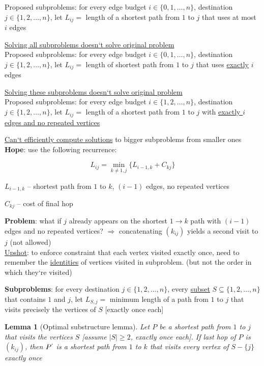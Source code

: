 \documentclass[a4paper,12pt]{article}
\theoremstyle{plain}
\newtheorem*{lemma}{Lemma}
\theoremstyle{definition}
\theoremstyle{remark}
\begin{document}
Proposed subproblems: for every edge budget $i \in \{0, 1, \dots, n\}$, destination $j \in \{1, 2, \dots, n\}$, let $L_{ij} =$ length of a shortest path from $1$ to $j$ that uses at most $i$ edges

\underline{Solving all subproblems doesn`t solve original problem}
\\

Proposed subproblems: for every edge budget $i \in \{0, 1, \dots, n\}$, destination $j \in \{1, 2, \dots, n\}$, let $L_{ij} =$ length of shortest path from $1$ to $j$ that uses \underline{exactly} $i$ edges

\underline{Solving these subproblems doesn`t solve original problem}
\\

Proposed subproblems: for every edge budget $i \in \{1, 2, \dots, n\}$, destination $j \in \{1, 2, \dots, n\}$, let $L_{ij} =$ length of a shortest path from $1$ to $j$ with \underline{exactly $i$ edges and no repeated vertices}

\underline{Can`t efficiently compute solutions} to bigger subproblems from smaller ones
\\

\textbf{Hope}: use the following recurrence:

\[
L_{ij} = \min\limits_{k \neq 1,j} \{ L_{i-1,k} + C_{kj} \}
\]

$L_{i-1,k}$ -- shortest path from $1$ to $k$, $(i-1)$ edges, no repeated vertices

$C_{kj}$ -- cost of final hop

\textbf{Problem}: what if $j$ already appears on the shortest $1 \rightarrow k$ path with $(i-1)$ edges and no repeated vertices? $\Rightarrow$ concatenating $(k_{ij})$ yields a second visit to $j$ (not allowed)
\\

\underline{Upshot}: to enforce constraint that each vertex visited exactly once, need to remember the \underline{identities} of vertices visited in subproblem. (but not the order in which they`re visited)

\textbf{Subproblems}: for every destination $j \in \{1, 2, \dots, n\}$, every \underline{subset} $S \subseteq \{1, 2, \dots, n\}$ that contains $1$ and $j$, let $L_{S,j} =$ minimum length of a path from $1$ to $j$ that visits precisely the vertices of $S$ [exactly once each]

\begin{lemma}
[Optimal substructure lemma] Let $P$ be a shortest path from $1$ to $j$ that visits the vertices $S$ [assume $|S| \geq 2$, exactly once each]. If last hop of $P$ is $(k_{ij})$, then $P^`$ is a shortest path from $1$ to $k$ that visits every vertex of $S - \{j\}$ exactly once
\end{lemma}
\end{document}
